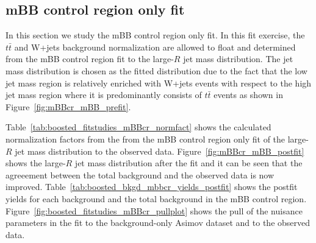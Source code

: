 \clearpage
\FloatBarrier


\subsection{mBB control region only fit}
\label{app:boosted_fitstudies_mBBcr}

In this section we study the mBB control region only fit. In this fit exercise, the $t\bar{t}$ and W+jets background normalization 
are allowed to float and determined from the mBB control region fit to the large-$R$ jet mass distribution. The jet mass distribution is chosen
as the fitted distribution due to the fact that the low jet mass region is relatively enriched with W+jets events with respect to the 
high jet mass region where it is predominantly consists of $t\bar{t}$ events as shown in Figure~\ref{fig:mBBcr_mBB_prefit}.

Table~\ref{tab:boosted_fitstudies_mBBcr_normfact} shows the calculated normalization factors from the from the mBB control
region only fit of the large-$R$ jet mass distribution to the observed data. Figure~\ref{fig:mBBcr_mBB_postfit} shows 
the large-$R$ jet mass distribution after the fit and it can be seen that the agreeement between the total background
and the observed data is now improved. Table~\ref{tab:boosted_bkgd_mbbcr_yields_postfit} shows the postfit yields for
each background and the total background in the mBB control region. Figure~\ref{fig:boosted_fitstudies_mBBcr_pullplot} shows the 
pull of the nuisance parameters in the fit to the background-only Asimov dataset and to the observed data. 
 

